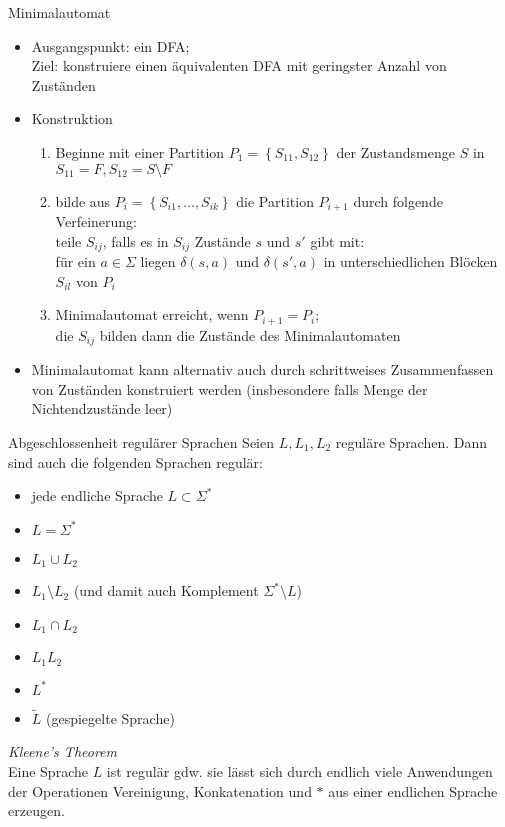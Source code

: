 \begin{frame}{Minimalautomat}
	\begin{itemize}
		\item Ausgangspunkt: ein DFA;\\
		Ziel: konstruiere einen äquivalenten DFA mit geringster Anzahl von Zuständen
		\item Konstruktion
		\begin{enumerate}
			\item Beginne mit einer Partition $P_1=\left\{S_{11}, S_{12}\right\}$ der Zustandsmenge $S$ in $S_{11}=F, S_{12}=S \setminus F$
			\item bilde aus $P_i=\left\{S_{i1},\ldots,S_{ik}\right\}$ die Partition $P_{i+1}$ durch folgende Verfeinerung:\\
			teile $S_{ij}$, falls es in $S_{ij}$ Zustände $s$ und $s'$ gibt mit:\\
			für ein $a \in \Sigma$ liegen $\delta(s, a)$ und $\delta(s', a)$ in unterschiedlichen Blöcken $S_{il}$ von $P_i$
			\item Minimalautomat erreicht, wenn $P_{i+1}=P_i$;\\
			die $S_{ij}$ bilden dann die Zustände des Minimalautomaten
		\end{enumerate}
		\item Minimalautomat kann alternativ auch durch schrittweises Zusammenfassen von Zuständen konstruiert werden (insbesondere falls Menge der Nichtendzustände leer)
	\end{itemize}
\end{frame}

\begin{frame}{Abgeschlossenheit regulärer Sprachen}
	Seien $L, L_1, L_2$ reguläre Sprachen. Dann sind auch die folgenden Sprachen regulär:
	\begin{itemize}
		\item jede endliche Sprache $L \subset \Sigma^*$
		\item $L = \Sigma^*$
		\item $L_1 \cup L_2$
		\item $L_1 \setminus L_2$ (und damit auch Komplement $\Sigma^* \setminus L$)
		\item $L_1 \cap L_2$
		\item $L_1L_2$
		\item $L^*$
		\item $\tilde{L}$ (gespiegelte Sprache)
	\end{itemize}
	\emph{Kleene's Theorem}\\
		Eine Sprache $L$ ist regulär gdw. sie lässt sich durch endlich viele
		Anwendungen der Operationen Vereinigung, Konkatenation und $*$ aus
		einer endlichen Sprache erzeugen.
\end{frame}

